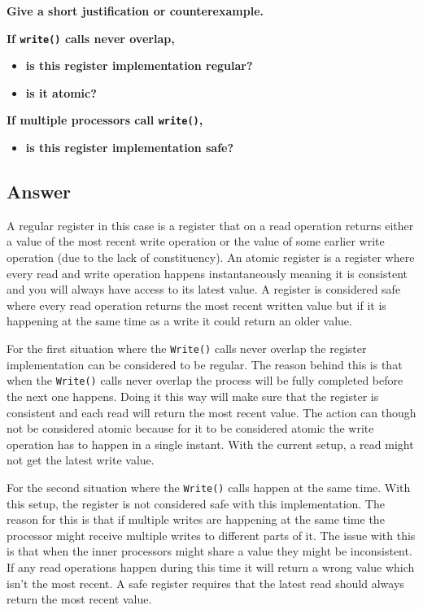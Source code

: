 \documentclass{article}
\begin{document}
\textbf{Give a short justification or counterexample.}

\textbf{If \texttt{write()} calls never overlap,}

\begin{itemize}
    \item \textbf{is this register implementation regular?}
    \item \textbf{is it atomic?}
\end{itemize}

\textbf{If multiple processors call \texttt{write()},}

\begin{itemize}
    \item \textbf{is this register implementation safe?}
\end{itemize}


\subsection*{Answer}
A regular register in this case is a register that on a read operation returns either a value of the most recent write operation or the value of some earlier write operation (due to the lack of constituency). An atomic register is a register where every read and write operation happens instantaneously meaning it is consistent and you will always have access to its latest value. A register is considered safe where every read operation returns the most recent written value but if it is happening at the same time as a write it could return an older value.

For the first situation where the \texttt{Write()} calls never overlap the register implementation can be considered to be regular. The reason behind this is that when the \texttt{Write()} calls never overlap the process will be fully completed before the next one happens. Doing it this way will make sure that the register is consistent and each read will return the most recent value. The action can though not be considered atomic because for it to be considered atomic the write operation has to happen in a single instant. With the current setup, a read might not get the latest write value.

For the second situation where the \texttt{Write()} calls happen at the same time. With this setup, the register is not considered safe with this implementation. The reason for this is that if multiple writes are happening at the same time the processor might receive multiple writes to different parts of it. The issue with this is that when the inner processors might share a value they might be inconsistent. If any read operations happen during this time it will return a wrong value which isn't the most recent. A safe register requires that the latest read should always return the most recent value.



\newpage
\printbibliography
\end{document}
